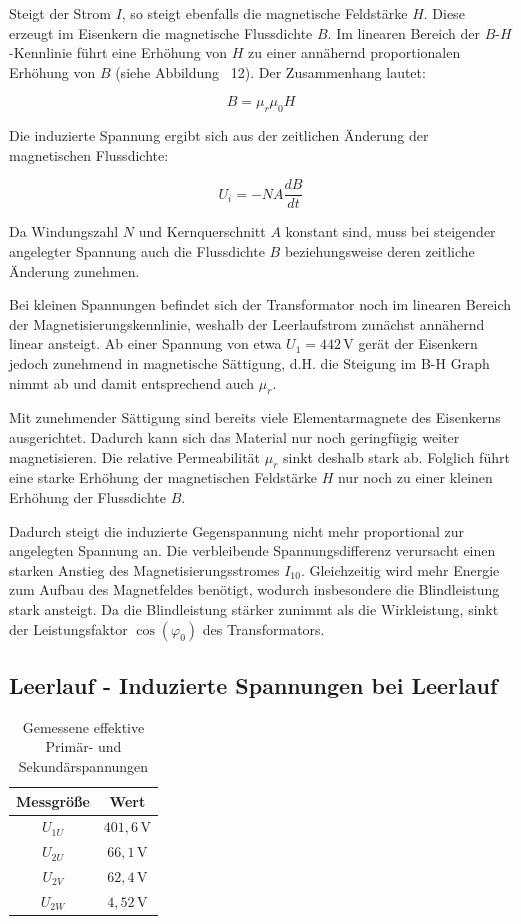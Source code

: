 \documentclass{article}
\begin{document}
	
	Steigt der Strom \(I\), so steigt ebenfalls die magnetische Feldstärke \(H\). Diese erzeugt im Eisenkern die magnetische Flussdichte \(B\). Im linearen Bereich der \(B\)-\(H\)-Kennlinie führt eine Erhöhung von \(H\) zu einer annähernd proportionalen Erhöhung von \(B\) (siehe Abbildung ~12). Der Zusammenhang lautet:
	
	\[
	B = \mu_r \mu_0 H
	\]
	
	Die induzierte Spannung ergibt sich aus der zeitlichen Änderung der magnetischen Flussdichte:
	
	\[
	U_i = -N A \frac{dB}{dt}
	\]
	
	Da Windungszahl \(N\) und Kernquerschnitt \(A\) konstant sind, muss bei steigender angelegter Spannung auch die Flussdichte \(B\) beziehungsweise deren zeitliche Änderung zunehmen.
	
	Bei kleinen Spannungen befindet sich der Transformator noch im linearen Bereich der Magnetisierungskennlinie, weshalb der Leerlaufstrom zunächst annähernd linear ansteigt. Ab einer Spannung von etwa \(U_1 = 442\,\mathrm{V}\) gerät der Eisenkern jedoch zunehmend in magnetische Sättigung, d.H. die Steigung im B-H Graph nimmt ab und damit entsprechend auch \(\mu_r\).
	
	Mit zunehmender Sättigung sind bereits viele Elementarmagnete des Eisenkerns ausgerichtet. Dadurch kann sich das Material nur noch geringfügig weiter magnetisieren. Die relative Permeabilität \(\mu_r\) sinkt deshalb stark ab. Folglich führt eine starke Erhöhung der magnetischen Feldstärke \(H\) nur noch zu einer kleinen Erhöhung der Flussdichte \(B\).
	
	Dadurch steigt die induzierte Gegenspannung nicht mehr proportional zur angelegten Spannung an. Die verbleibende Spannungsdifferenz verursacht einen starken Anstieg des Magnetisierungsstromes \(I_{10}\). Gleichzeitig wird mehr Energie zum Aufbau des Magnetfeldes benötigt, wodurch insbesondere die Blindleistung stark ansteigt. Da die Blindleistung stärker zunimmt als die Wirkleistung, sinkt der Leistungsfaktor \(\cos(\varphi_0)\) des Transformators.
	
	\subsection{Leerlauf - Induzierte Spannungen bei Leerlauf}
	
	\begin{table}[h]
		\centering
		\begin{tabular}{|c|c|}
			\hline
			Messgröße & Wert \\ 
			\hline
			\(U_{1U}\)   & \(401{,}6\,\mathrm{V}\) \\ 
			\hline
			\(U_{2U}\) & \(66{,}1\,\mathrm{V}\) \\ 
			\hline
			\(U_{2V}\) & \(62{,}4\,\mathrm{V}\) \\ 
			\hline
			\(U_{2W}\) & \(4{,}52\,\mathrm{V}\) \\ 
			\hline
		\end{tabular}
		\caption{Gemessene effektive Primär- und Sekundärspannungen}
		\label{tab:spannungen}
	\end{table}
	
\end{document}
